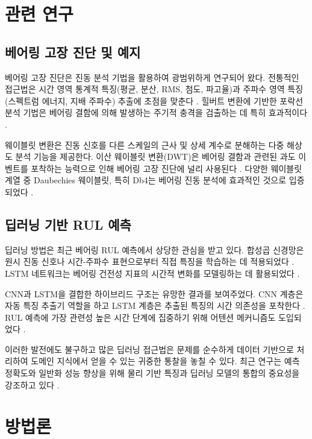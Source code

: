\documentclass[conference,twocolumn]{IEEEtran}
\begin{document}
\section{관련 연구}

\subsection{베어링 고장 진단 및 예지}

베어링 고장 진단은 진동 분석 기법을 활용하여 광범위하게 연구되어 왔다. 전통적인 접근법은 시간 영역 통계적 특징(평균, 분산, RMS, 첨도, 파고율)과 주파수 영역 특징(스펙트럼 에너지, 지배 주파수) 추출에 초점을 맞춘다 \cite{randall2011rolling}. 힐버트 변환에 기반한 포락선 분석 기법은 베어링 결함에 의해 발생하는 주기적 충격을 검출하는 데 특히 효과적이다 \cite{mccormick1998cyclostationarity}.

웨이블릿 변환은 진동 신호를 다른 스케일의 근사 및 상세 계수로 분해하는 다중 해상도 분석 기능을 제공한다. 이산 웨이블릿 변환(DWT)은 베어링 결함과 관련된 과도 이벤트를 포착하는 능력으로 인해 베어링 고장 진단에 널리 사용된다 \cite{kumar2013wavelet}. 다양한 웨이블릿 계열 중 Daubechies 웨이블릿, 특히 Db4는 베어링 진동 분석에 효과적인 것으로 입증되었다 \cite{toma2020bearing, nizwan2016wavelet}.

\subsection{딥러닝 기반 RUL 예측}

딥러닝 방법은 최근 베어링 RUL 예측에서 상당한 관심을 받고 있다. 합성곱 신경망은 원시 진동 신호나 시간-주파수 표현으로부터 직접 특징을 학습하는 데 적용되었다 \cite{li2018remaining}. LSTM 네트워크는 베어링 건전성 지표의 시간적 변화를 모델링하는 데 활용되었다 \cite{zhao2017machine}.

CNN과 LSTM을 결합한 하이브리드 구조는 유망한 결과를 보여주었다. CNN 계층은 자동 특징 추출기 역할을 하고 LSTM 계층은 추출된 특징의 시간 의존성을 포착한다 \cite{chen2020bearing}. RUL 예측에 가장 관련성 높은 시간 단계에 집중하기 위해 어텐션 메커니즘도 도입되었다 \cite{wang2020remaining}.

이러한 발전에도 불구하고 많은 딥러닝 접근법은 문제를 순수하게 데이터 기반으로 처리하여 도메인 지식에서 얻을 수 있는 귀중한 통찰을 놓칠 수 있다. 최근 연구는 예측 정확도와 일반화 성능 향상을 위해 물리 기반 특징과 딥러닝 모델의 통합의 중요성을 강조하고 있다 \cite{li2020deep}.

\section{방법론}
\end{document}
